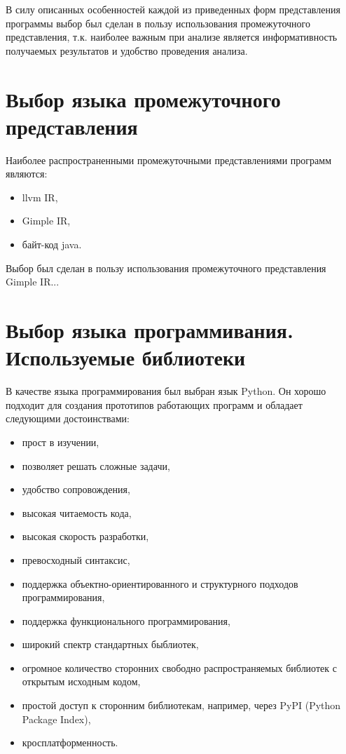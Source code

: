 В силу описанных особенностей каждой из приведенных форм представления программы выбор был сделан в пользу использования промежуточного представления, т.к. наиболее важным при анализе является информативность получаемых результатов и удобство проведения анализа.

\section{Выбор языка промежуточного представления}

Наиболее распространенными промежуточными представлениями программ являются:
\begin{itemize}
  \item llvm IR,
  \item Gimple IR,
  \item байт-код java.
\end{itemize}

Выбор был сделан в пользу использования промежуточного представления Gimple IR...

\section{Выбор языка программивания. Используемые библиотеки}

В качестве языка программирования был выбран язык Python. Он хорошо подходит для создания прототипов работающих программ и обладает следующими достоинствами:
\begin{itemize}
  \item прост в изучении,
  \item позволяет решать сложные задачи,
  \item удобство сопровождения,
  \item высокая читаемость кода,
  \item высокая скорость разработки,
  \item превосходный синтаксис,
  \item поддержка объектно-ориентированного и структурного подходов программирования,
  \item поддержка функционального программирования,
  \item широкий спектр стандартных быблиотек,
  \item огромное количество сторонних свободно распространяемых библиотек с открытым исходным кодом,
  \item простой доступ к сторонним библиотекам, например, через PyPI (Python Package Index),
  \item кросплатформенность.
\end{itemize}

